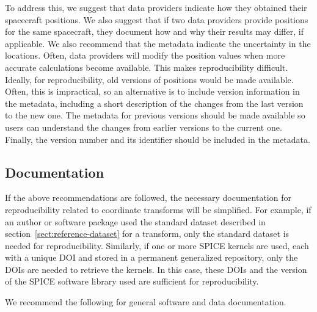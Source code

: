 \documentclass[draft]{agujournal2019}
\begin{document}
To address this, we suggest that data providers indicate how they obtained their spacecraft positions. We also suggest that if two data providers provide positions for the same spacecraft, they document how and why their results may differ, if applicable. We also recommend that the metadata indicate the uncertainty in the locations. Often, data providers will modify the position values when more accurate calculations become available. This makes reproducibility difficult. Ideally, for reproducibility, old versions of positions would be made available. Often, this is impractical, so an alternative is to include version information in the metadata, including a short description of the changes from the last version to the new one. The metadata for previous versions should be made available so users can understand the changes from earlier versions to the current one. Finally, the version number and its identifier should be included in the metadata.

\subsection{Documentation}

If the above recommendations are followed, the necessary documentation for reproducibility related to coordinate transforms will be simplified. For example, if an author or software package used the standard dataset described in section~\ref{sect:reference-dataset} for a transform, only the standard dataset is needed for reproducibility. Similarly, if one or more SPICE kernels are used, each with a unique DOI and stored in a permanent generalized repository, only the DOIs are needed to retrieve the kernels. In this case, these DOIs and the version of the SPICE software library used are sufficient for reproducibility.

We recommend the following for general software and data documentation.
\end{document}
